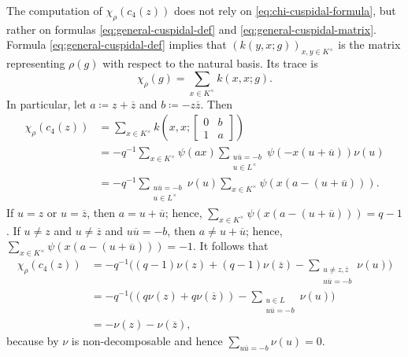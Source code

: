 \documentclass[../main.tex]{subfiles}
\begin{document}
The computation of $\chi_\rho(c_4(z))$ does not rely on \eqref{eq:chi-cuspidal-formula}, but rather on formulas \eqref{eq:general-cuspidal-def} and \eqref{eq:general-cuspidal-matrix}. Formula \eqref{eq:general-cuspidal-def} implies that $(k(y,x;g))_{x,y\in K^\times}$ is the matrix representing $\rho(g)$ with respect to the natural basis. Its trace is
\[\chi_\rho(g)=\sum_{x\in K^\times}k(x,x;g).\]
In particular, let $a\coloneqq z+\overline z$ and $b\coloneqq-z\overline z$. Then
\begin{align*}
	\chi_\rho(c_4(z)) &= \sum_{x\in K^\times}k\left(x,x;\begin{bmatrix}
		0 & b \\
		1 & a
	\end{bmatrix}\right) \\
	&= -q^{-1}\sum_{x\in K^\times}\psi(ax)\sum_{\substack{u\overline u=-b\\u\in L^\times}}\psi\left(-x(u+\overline u)\right)\nu(u) \\
	&= -q^{-1}\sum_{\substack{u\overline u=-b\\u\in L^\times}}\nu(u)\sum_{x\in K^\times}\psi(x(a-(u+\overline u))).
\end{align*}
If $u=z$ or $u=\overline z$, then $a=u+\overline u$; hence, $\sum_{x\in K^\times}\psi(x(a-(u+\overline u)))=q-1$. If $u\ne z$ and $u\ne\overline z$ and $u\overline u=-b$, then $a\ne u+\overline u$; hence, $\sum_{x\in K^\times}\psi(x(a-(u+\overline u)))=-1$. It follows that
\begin{align*}
	\chi_\rho(c_4(z)) &= -q^{-1}\Bigg((q-1)\nu(z)+(q-1)\nu(\overline z)-\sum_{\substack{u\ne z,\overline z\\u\overline u=-b}}\nu(u)\Bigg) \\
	&= -q^{-1}\Bigg((q\nu(z)+q\nu(\overline z))-\sum_{\substack{u\in L\\u\overline u=-b}}\nu(u)\Bigg) \\
	&= -\nu(z)-\nu(\overline z),
\end{align*}
because by  $\nu$ is non-decomposable and hence $\sum_{u\overline u=-b}\nu(u)=0$.
\end{document}
